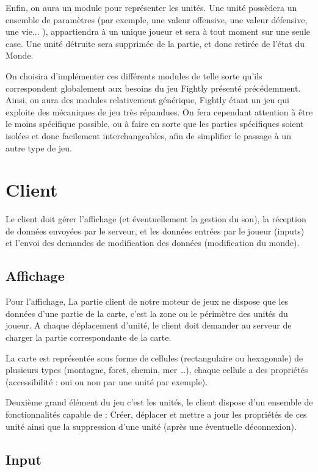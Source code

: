 \documentclass[a4paper,10pt]{report}
\begin{document}
        Enfin, on aura un module pour représenter les unités. Une unité possèdera un ensemble de paramètres (par exemple, une valeur offensive, une valeur défensive, une vie... ), appartiendra à un unique joueur et sera à tout moment sur une seule case. Une unité détruite sera supprimée de la partie, et donc retirée de l'état du Monde. 
        
        On choisira d'implémenter ces différents modules de telle sorte qu'ils correspondent globalement aux besoins du jeu Fightly présenté précédemment. Ainsi, on aura des modules relativement générique, Fightly étant un jeu qui exploite des mécaniques de jeu très répandues. On fera cependant attention à être le moins spécifique possible, ou à faire en sorte que les parties spécifiques soient isolées et donc facilement interchangeables, afin de simplifier le passage à un autre type de jeu. 
        
        
    \section{Client}

      Le client doit gérer l'affichage (et éventuellement la gestion du son), la réception de données envoyées par le serveur, et les données entrées par le joueur (inputs) et l'envoi des demandes de modification des données (modification du monde).

      \subsection{Affichage}

        Pour l’affichage, La partie client de notre moteur de jeux ne dispose que les données d’une partie de la carte, c’est la zone ou le périmètre des unités du joueur. A chaque déplacement d’unité, le client doit demander au serveur de charger la partie  correspondante de la carte.

        La carte est représentée sous forme de cellules (rectangulaire ou hexagonale) de plusieurs types (montagne, foret, chemin, mer …), chaque cellule a des propriétés (accessibilité : oui ou non par une unité par exemple).

        Deuxième grand élément du jeu c’est les unités, le client dispose d’un ensemble de fonctionnalités capable de : Créer, déplacer et mettre a jour les propriétés de ces unité ainsi que la suppression d’une unité (après une éventuelle déconnexion).

      \subsection{Input}
\end{document}

